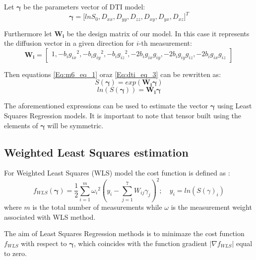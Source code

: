Let $\boldsymbol{\gamma}$ be the parameters vector of DTI model:
\begin{equation}
\boldsymbol{\gamma}={\lbrack ln{S_0}, D_{xx}, D_{yy}, D_{zz}, D_{xy}, D_{yx}, D_{xz}\rbrack}^T
\label{Eq:m6_eq_4}
\end{equation}

Furthermore let $\boldsymbol{W_i}$ be the design matrix of our model. In this case it represents the diffusion vector in a given direction for $i$-th measurement:
\begin{equation}
\boldsymbol{W_i}=
\begin{bmatrix}
1, -b_i{g_{ix}}^2, -b_i{g_{iy}}^2, -b_i{g_{iz}}^2, -2b_ig_{ix}g_{iy}, -2b_ig_{iy}g_{iz}, -2b_ig_{ix}g_{iz}
\end{bmatrix}
\label{Eq:m6_eq_5}
\end{equation} 

Then equations \ref{Eq:m6_eq_1} oraz \ref{Eq:dti_eq_3} can be rewritten as:
\begin{equation}
S\left(\boldsymbol{\gamma}\right) =  exp\left(\boldsymbol{W_i\gamma}\right)
\label{Eq:m6_eq_6}
\end{equation}
\begin{equation}
ln\left({S\left(\boldsymbol{\gamma}\right)}\right) =  \boldsymbol{W_i\gamma}
\label{Eq:m6_eq_7}
\end{equation}

The aforementioned expressions can be used to estimate the vector $\boldsymbol{\gamma}$ using Least Squares Regression models. It is important to note that tensor built using the elements of $\boldsymbol{\gamma}$ will be symmetric.

\hfill
\subsection{Weighted Least Squares estimation}

For Weighted Least Squares (WLS) model the cost function is defined as \cite{m6_koay2006a}:
\begin{equation}
f_{WLS}\left(\boldsymbol{\gamma}\right)=\frac{1}{2}\sum_{i=1}^{m}{{\omega_i}^2\left(y_i-\sum_{j=1}^{7}{W_{ij}\gamma_{j}}\right)^2}; \quad y_i=ln(S(\gamma)_i)
\label{Eq:m6_eq_8}
\end{equation}
where $m$ is the total number of measurements while $\omega$ is the measurement weight associated with WLS method.

The aim of Least Squares Regression methods is to minimaze the cost function $f_{WLS}$ with respect to $\boldsymbol{\gamma}$, which coincides with the function gradient $\left|\nabla{f_{WLS}}\right|$ equal to zero.


